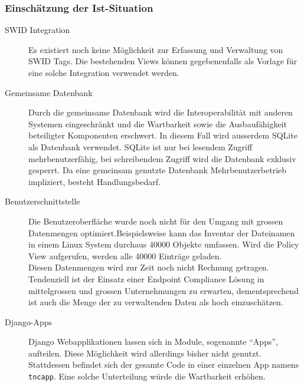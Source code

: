 \subsubsection{Einschätzung der Ist-Situation}
\label{analyse:einschaezung}

\begin{description}

	\item[SWID Integration] Es existiert noch keine Möglichkeit zur Erfassung und
	Verwaltung von SWID Tags. Die bestehenden Views können gegebenenfalls als
	Vorlage für eine solche Integration verwendet werden.
	
	\item[Gemeinsame Datenbank] Durch die gemeinsame Datenbank wird die
	Interoperabilität mit anderen Systemen eingeschränkt und die Wartbarkeit sowie
	die Ausbaufähigkeit beteiligter Komponenten erschwert. In diesem Fall wird
	ausserdem SQLite als Datenbank verwendet. SQLite ist nur bei lesendem Zugriff
	mehrbenutzerfähig, bei schreibendem Zugriff wird die Datenbank exklusiv
	gesperrt. Da eine gemeinsam genutzte Datenbank Mehrbenutzerbetrieb impliziert,
	besteht Handlungsbedarf.

	\item[Benutzerschnittstelle] Die Benutzeroberfläche wurde noch nicht für den
	Umgang mit grossen Datenmengen optimiert.Beispielsweise kann das Inventar der
	Dateinamen in einem Linux System durchaus 40000 Objekte umfassen. Wird die
	Policy View aufgerufen, werden alle 40000 Einträge geladen.\\ Diesen
	Datenmengen wird zur Zeit noch nicht Rechnung getragen. Tendenziell ist der
	Einsatz einer Endpoint Compliance Lösung in mittelgrossen und grossen
	Unternehmungen zu erwarten, dementsprechend ist auch die Menge der zu
	verwaltenden Daten als hoch einzuschätzen.
	
	\item[Django-Apps] Django Webapplikationen lassen sich in Module, sogenannte
	\enquote{Apps}, aufteilen. Diese Möglichkeit wird allerdings bisher nicht
	genutzt. Stattdessen befindet sich der gesamte Code in einer einzelnen App
	namens \texttt{tncapp}. Eine solche Unterteilung würde die Wartbarkeit erhöhen.
	

\end{description}
